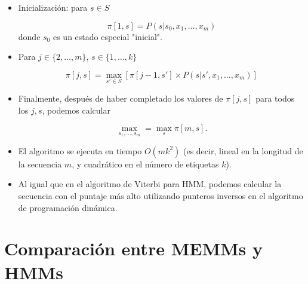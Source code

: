 \begin{itemize}

\item Inicialización: para $s \in S$

\begin{displaymath}
\pi[1,s] = P (s | s_0,x_1,\dots,x_m)
\end{displaymath}
donde $s_0$ es un estado especial "inicial".

\item Para $j \in \{2,\dots,m\}$, $s \in \{1,\dots,k\}$

\begin{displaymath}
\pi[j,s] = \max_{s' \in S} [\pi[j-1,s'] \times P (s | s',x_1,\dots,x_m)]
\end{displaymath}


\item Finalmente, después de haber completado los valores de $\pi[j,s]$ para todos los $j, s$, podemos calcular

\begin{displaymath}
\max_{s_1,\dots,s_m} = \max_{s} \pi[m,s].
\end{displaymath}


\item El algoritmo se ejecuta en tiempo $O(mk^2)$ (es decir, lineal en la longitud de la secuencia $m$, y cuadrático en el número de etiquetas $k$).

\item Al igual que en el algoritmo de Viterbi para HMM, podemos calcular la secuencia con el puntaje más alto utilizando punteros inversos en el algoritmo de programación dinámica.

\end{itemize}




\section{Comparación entre MEMMs y HMMs}

